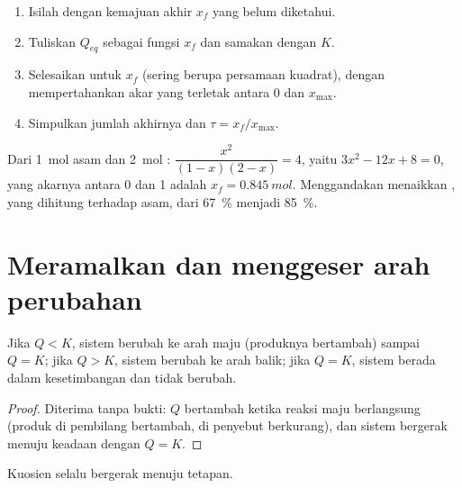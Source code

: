 \begin{method}\label{met:g12:equilibrium:final}
\begin{enumerate}
  \item Isilah  dengan kemajuan akhir $x_f$ yang belum
        diketahui.
  \item Tuliskan $Q_{eq}$ sebagai fungsi $x_f$ dan samakan dengan $K$.
  \item Selesaikan untuk $x_f$ (sering berupa persamaan kuadrat), dengan
        mempertahankan akar yang terletak antara 0 dan $x_{\max}$.
  \item Simpulkan jumlah akhirnya dan $\tau = x_f/x_{\max}$.
\end{enumerate}
\end{method}

\begin{example}\label{ex:g12:equilibrium:excess}
Dari \qty{1}{mol} asam dan \qty{2}{mol} :
$\dfrac{x^2}{(1-x)(2-x)} = 4$, yaitu $3x^2 - 12x + 8 = 0$, yang akarnya
antara 0 dan 1 adalah $x_f = \qty{0.845}{mol}$. Menggandakan 
menaikkan , yang dihitung terhadap asam, dari \qty{67}{\percent}
menjadi \qty{85}{\percent}.
\end{example}

\section{Meramalkan dan menggeser arah perubahan}

\begin{proposition}\label{prop:g12:equilibrium:direction}
Jika $Q < K$, sistem berubah ke arah maju (produknya bertambah) sampai
$Q = K$; jika $Q > K$, sistem berubah ke arah balik; jika $Q = K$,
sistem berada dalam kesetimbangan dan tidak berubah.
\end{proposition}

\begin{proof}
Diterima tanpa bukti: $Q$ bertambah ketika reaksi maju berlangsung
(produk di pembilang bertambah,  di penyebut berkurang), dan
sistem bergerak menuju keadaan dengan $Q = K$.
\end{proof}

\begin{omfigure}

{\small Kuosien selalu bergerak menuju tetapan.}
\end{omfigure}

